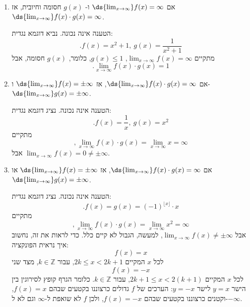 \begin{enumerate}
    \item אם
    $\ds{\lim_{x\to \infty}}f(x)=\infty$ ו-
    $g(x)$
    חסומה וחיובית,
    אז
    $\ds{\lim_{x\to \infty}}f(x)\cdot g(x)=\infty$.

\ifsol
{}
\begin{solbox}
הטענה אינה נכונה.
נביא דוגמא נגדית:
$$.f(x)=x^2+1,\ g(x)=\frac{1}{x^2+1}$$
מתקיים
$\displaystyle\lim_{x\to\infty}f(x)=\infty$,
$g(x)\leq 1$,
כלומר,
$g(x)$
חסומה, אבל
$$.\lim_{x\to\infty}f(x)\cdot g(x)=1$$
\end{solbox}
\fi

    \item אם
    $\ds{\lim_{x\to\infty}}f(x)\cdot g(x)=\infty$,
    אז
    $\ds{\lim_{x\to\infty}}f(x)=\pm\infty$
    ו-
    $\ds{\lim_{x\to\infty}}g(x)=\pm\infty$.

\ifsol
{}
\begin{solbox}
    הטענה אינה נכונה.
    נציג דוגמא נגדית:
    $$.f(x)=\frac{1}{x},\ g(x)=x^2$$
    מתקיים
    $$,\lim_{x\to\infty}f(x)\cdot g(x)=\lim_{x\to\infty}x=\infty$$
    אבל
    $\displaystyle\lim_{x\to\infty}f(x)=0\neq\pm\infty$.
\end{solbox}
\fi

    \item אם
    $\ds{\lim_{x\to\infty}}f(x)\cdot g(x)=\infty$,
    אז
    $\ds{\lim_{x\to\infty}}f(x)=\pm\infty$
    או
    $\ds{\lim_{x\to\infty}}g(x)=\pm\infty$.

\ifsol
{}
\begin{solbox}
        הטענה אינה נכונה.
    נציג דוגמא נגדית:
    $$.f(x)=g(x)=(-1)^{\lfloor x\rfloor}\cdot x$$
    מתקיים
    $$,\lim_{x\to\infty}f(x)\cdot g(x)=\lim_{x\to\infty}x^2=\infty$$
    אבל
    $\displaystyle\lim_{x\to\infty}f(x)\neq\pm\infty$,
    למעשה, הגבול לא קיים כלל.
    כדי לראות את זה, נחשוב איך נראית הפונקציה:
    $$f(x)=x$$
לכל $x$ המקיים $2k\leq x<2k+1$, עבור $k\in\mathbb{Z}$,
    מצד שני
    $$f(x)=-x$$
לכל $x$ המקיים $2k+1\leq x<2(k+1)$, עבור $k\in\mathbb{Z}$.
כלומר הגרף קופץ לסירוגין בין הישר $y=x$ לישר $y=-x$:
הערכים של $f$ גדולים כרצוננו בקטעים שבהם $f(x)=x$, וקטנים כרצוננו בקטעים שבהם $f(x)=-x$, ולכן $f$ לא שואפת ל-$\infty$ וגם לא ל-$-\infty$.
\end{solbox}
\fi


\end{enumerate}
